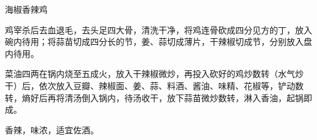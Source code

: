 \begin{recipe}[钢铁仔鸡]{海椒香辣鸡}

\ingredients


\cooking

\step 鸡宰杀后去血退毛，去头足四大骨，清洗干净，将鸡连骨砍成四分见方的丁，放入碗内待用；将蒜苗切成四分长的节，姜、蒜切成薄片，干辣椒切成节，分别放入盘内待用。

\step 菜油四两在锅内烧至五成火，放入干辣椒微炒，再投入砍好的鸡炒数转（水气炒干）后，依次放入豆瓣、辣椒面、姜、蒜、料酒、酱油、味精、花椒等，铲动数转，熵好后再将清汤倒入锅内，待汤收干，放下蒜苗微炒数转，淋入香油，起锅即成。

\notes

香辣，味浓，适宜佐酒。

\end{recipe}

